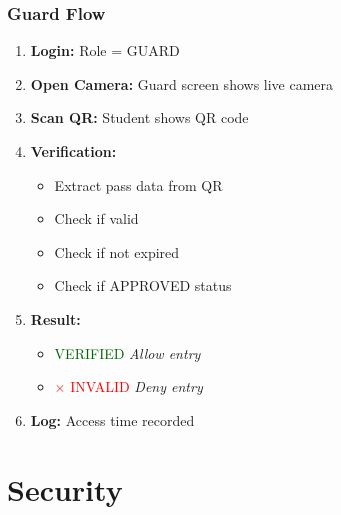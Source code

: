 \documentclass[11pt]{beamer}
\begin{document}
\begin{frame}
\frametitle{Guard Flow}
\begin{enumerate}
    \item \textbf{Login:} Role = GUARD
    \item \textbf{Open Camera:} Guard screen shows live camera
    \item \textbf{Scan QR:} Student shows QR code
    \item \textbf{Verification:}
    \begin{itemize}
        \item Extract pass data from QR
        \item Check if valid
        \item Check if not expired
        \item Check if APPROVED status
    \end{itemize}
    \item \textbf{Result:}
    \begin{itemize}
        \item \textcolor{darkgreen}{\checkmark VERIFIED} \textit{Allow entry}
        \item \textcolor{red}{\(\times\) INVALID} \textit{Deny entry}
    \end{itemize}
    \item \textbf{Log:} Access time recorded
\end{enumerate}
\end{frame}

\section{Security}
\end{document}
